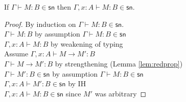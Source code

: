 \documentclass{article}
\newcommand{\csn}{\mathsf{sn}}
\newcommand{\red}{\longrightarrow}
\begin{document}
\begin{lemma}
If $\Gamma \vdash M : B \in \csn$ then $\Gamma, x{:}A \vdash M : B \in \csn$.
\end{lemma}
\begin{proof}
By induction on $\Gamma \vdash M : B \in \csn$.
 \\[1em]
$\Gamma \vdash M : B$ \hfill by assumption $\Gamma \vdash M : B \in \csn$\\
$\Gamma, x{:}A \vdash M : B$ \hfill by weakening of typing\\
Assume $\Gamma, x{:}A \vdash M \red M' : B$\\
$\Gamma \vdash M \red M' : B$ \hfill by strengthening (Lemma \ref{lem:redprop}) \\
$\Gamma \vdash M' : B \in \csn$ \hfill by assumption $\Gamma \vdash M : B \in \csn$\\
$\Gamma, x{:}A \vdash M' : B \in \csn$  \hfill by IH\\
$\Gamma, x{:}A \vdash M : B \in \csn$ \hfill since $M'$ was arbitrary

\end{proof}
\end{document}
